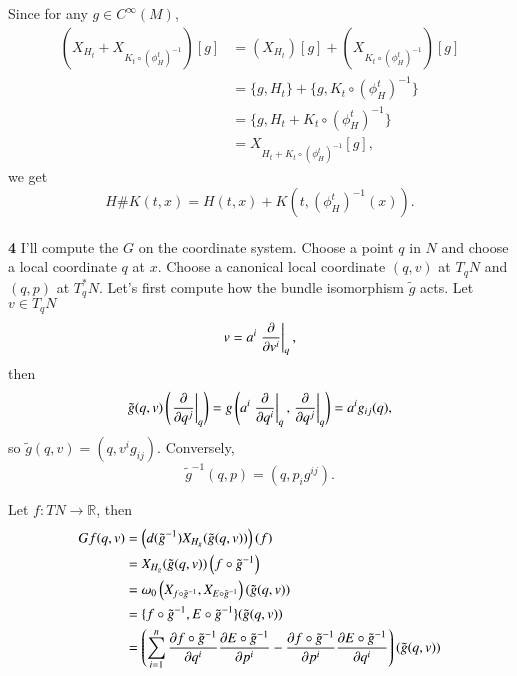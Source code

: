 \documentclass[a4paper, 12pt]{article}
\theoremstyle{Mydefinition}
\theoremstyle{Mytheorem}
\begin{document}
Since for any $g\in C^\infty(M)$,
\begin{equation*}
\begin{split}
\left(X_{H_t}+X_{K_t\circ (\phi_H^t)^{-1}}\right)[g] &= \left(X_{H_t}\right)[g]+\left(X_{K_t\circ (\phi_H^t)^{-1}}\right)[g]\\
&=\{g,H_t\} + \{g,K_t\circ (\phi_H^t)^{-1}\}\\
&=\{g, H_t + K_t\circ (\phi_H^t)^{-1}\}\\
&=X_{H_t + K_t\circ (\phi_H^t)^{-1}}[g],
\end{split}
\end{equation*}
we get
\begin{equation*}
H\#K(t,x) = H(t,x) + K(t,(\phi_H^t)^{-1}(x)).
\end{equation*}
\\
\noindent \textbf{4}
I'll compute the $G$ on the coordinate system. Choose a point $q$ in $N$ and choose a local coordinate $q$ at $x$. Choose a canonical local coordinate $(q,v)$ at $T_qN$ and $(q,p)$ at $T^*_qN$. Let's first compute how the bundle isomorphism $\tilde{g}$ acts. Let $v\in T_qN$
\begin{equation*}
    v = a^i \left.\pdv{v^i}\right|_q,
\end{equation*}
then
\begin{equation*}
    \tilde{g}(q,v)\left(\left.\pdv{q^j}\right|_{q}\right) = g\left(a^i \left.\pdv{q^i}\right|_q,\left.\pdv{q^j}\right|_{q} \right) = a^ig_{ij}(q),
\end{equation*}
so $\tilde{g}(q,v) = (q, v^ig_{ij})$. Conversely,
\begin{equation*}
    \tilde{g}^{-1}(q,p) = (q, p_ig^{ij}).
\end{equation*}


Let $f:TN\rightarrow \mathbb{R}$, then
\begin{equation*}
\begin{split}
    Gf(q,v) &= \left(d(\tilde{g}^{-1})X_{H_g}(\tilde{g}(q,v))\right)(f)\\
    &=X_{H_g}(\tilde{g}(q,v))\left(f\circ \tilde{g}^{-1}\right)\\
    &=\omega_0\left(X_{f\circ \tilde{g}^{-1}}, X_{E\circ \tilde{g}^{-1}}\right)(\tilde{g}(q,v))\\
    &=\{f\circ \tilde{g}^{-1}, E\circ \tilde{g}^{-1}\}(\tilde{g}(q,v))\\
    &=\left(\sum_{i=1}^n \pdv{f\circ \tilde{g}^{-1}}{q^i}\pdv{E\circ \tilde{g}^{-1}}{p^i} - \pdv{f\circ \tilde{g}^{-1}}{p^i}\pdv{E\circ \tilde{g}^{-1}}{q^i}\right)(\tilde{g}(q,v))
\end{split}
\end{equation*}
\end{document}
